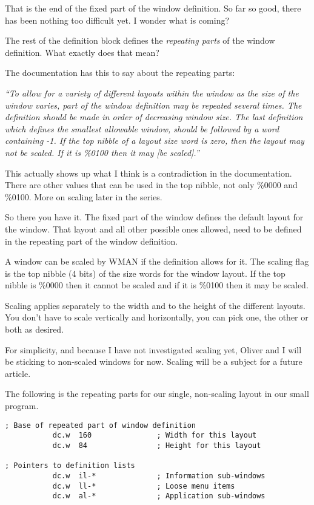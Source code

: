 That is the end of the fixed part of the window definition. So far
    so good, there has been nothing too difficult yet. I wonder what is
    coming?

The rest of the definition block defines the \emph{repeating
    parts} of the window definition. What exactly does that
    mean?

The documentation has this to say about the repeating parts:

\emph{``To allow for a variety of different layouts within the
    window as the size of the window varies, part of the window definition may
    be repeated several times. The definition should be made in order of
    decreasing window size. The last definition which defines the smallest
    allowable window, should be followed by a word containing -{}1. If the top
    nibble of a layout size word is zero, then the layout may not be scaled.
    If it is \%0100 then it may [be scaled].''}

\begin{note}
This actually shows up what I think is a contradiction in the
      documentation. There are other values that can be used in the top
      nibble, not only \%0000 and \%0100. More on scaling later in the
      series.
\end{note}

So there you have it. The fixed part of the window defines the
    default layout for the window. That layout and all other possible ones
    allowed, need to be defined in the repeating part of the window
    definition.

A window can be scaled by WMAN if the definition allows for it. The
    scaling flag is the top nibble (4 bits) of the size words for the window
    layout. If the top nibble is \%0000 then it cannot be scaled and if it is
    \%0100 then it may be scaled.

Scaling applies separately to the width and to the height of the
    different layouts. You don't have to scale vertically and horizontally,
    you can pick one, the other or both as desired.

For simplicity, and because I have not investigated scaling yet,
    Oliver and I will be sticking to non-{}scaled windows for now. Scaling will
    be a subject for a future article.

The following is the repeating parts for our single, non-{}scaling
    layout in our small program.

\begin{lstlisting}[firstnumber=last,caption={Main Window - Repeating Part}]
; Base of repeated part of window definition 
           dc.w  160               ; Width for this layout
           dc.w  84                ; Height for this layout

; Pointers to definition lists
           dc.w  il-*              ; Information sub-windows 
           dc.w  ll-*              ; Loose menu items
           dc.w  al-*              ; Application sub-windows
\end{lstlisting}

